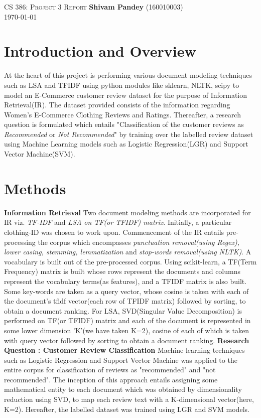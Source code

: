 \documentclass[a4paper, 12pt]{article}
\begin{document}
\noindent
\large\textsc{CS 386: Project 3 Report} \hfill \textbf{Shivam 
Pandey} (160010003) \\ %
\hfil \today



 
\section{Introduction and Overview}
At the heart of this project is performing various document modeling techniques such as LSA and TFIDF using python modules like sklearn, NLTK, scipy to model an E-Commerce customer review dataset for the purpose of Information Retrieval(IR). The dataset provided consists of the information regarding Women's E-Commerce Clothing Reviews and Ratings. Thereafter, a research question is formulated which entails "Classification of the customer reviews as \emph{Recommended} or \emph{Not Recommended}" by training over the labelled review dataset using Machine Learning models such as Logistic Regression(LGR) and Support Vector Machine(SVM).

\section{Methods}

\textbf{Information Retrieval} \newline
Two document modeling methods are incorporated for IR viz. \emph{TF-IDF} and \emph{LSA on TF(or TFIDF) matrix}. Initially, a particular clothing-ID was chosen to work upon. Commencement of the IR entails pre-processing the corpus which encompasses \emph{punctuation removal(using Regex), lower casing, stemming, lemmatization} and \emph{stop-words removal(using NLTK)}. A vocabulary is built out of the pre-processed corpus. Using scikit-learn, a TF(Term Frequency) matrix is built whose rows represent the documents and columns represent the vocabulary terms(as features), and a TFIDF matrix is also built. Some key-words are taken as a query vector, whose cosine is taken with each of the document's tfidf vector(each row of TFIDF matrix) followed by sorting, to obtain a document ranking. For LSA, SVD(Singular Value Decomposition) is performed on TF(or TFIDF) matrix and each of the document is represented in some lower dimension 'K'(we have taken K=2), cosine of each of which is taken with query vector followed by sorting to obtain a document ranking.
 \newline \newline
\textbf{Research Question : Customer Review Classification}\newline
Machine learning techniques such as Logistic Regression and Support Vector Machine was applied to the entire corpus for classification of reviews as "recommended" and "not recommended". The inception of this approach entails assigning some mathematical entity to each document which was obtained by dimensionality reduction using SVD, to map each review text with a K-dimensional vector(here, K=2). Hereafter, the labelled dataset was trained using LGR and SVM models.
\end{document}
